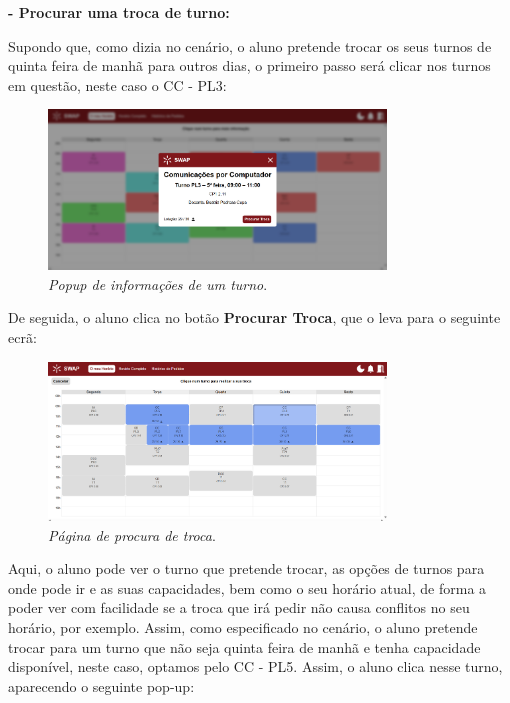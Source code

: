 \documentclass[12pt, a4paper]{article}
\begin{document}
\textbf{- Procurar uma troca de turno:}

Supondo que, como dizia no cenário, o aluno pretende trocar os seus turnos de quinta feira de
manhã para outros dias, o primeiro passo será clicar nos turnos em questão, neste caso o CC - PL3:

\begin{figure}[H]
    \centering
    \includegraphics[width=0.8\textwidth]{res/manual/popup_turno_meu_horario.png}
    \caption{\emph{Popup de informações de um turno}.}
    \label{popup_turno}
\end{figure}

De seguida, o aluno clica no botão \textbf{Procurar Troca}, que o leva para o seguinte ecrã:

\begin{figure}[H]
    \centering
    \includegraphics[width=0.8\textwidth]{res/manual/pagina_procura_troca_meu_horario.png}
    \caption{\emph{Página de procura de troca}.}
    \label{procura_troca}
\end{figure}

Aqui, o aluno pode ver o turno que pretende trocar, as opções de turnos para onde pode ir
e as suas capacidades, bem como o seu horário atual, de forma a poder ver com facilidade
se a troca que irá pedir não causa conflitos no seu horário, por exemplo.
Assim, como especificado no cenário, o aluno pretende trocar para um turno que não seja
quinta feira de manhã e tenha capacidade disponível, neste caso, optamos pelo CC - PL5.
Assim, o aluno clica nesse turno, aparecendo o seguinte pop-up:
\end{document}
